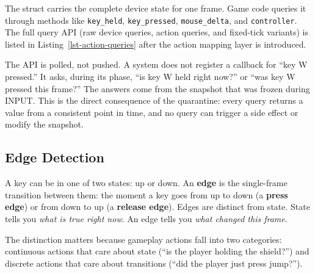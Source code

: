 \documentclass[
  11pt,
  letterpaper,
  DIV=11,
  numbers=noendperiod,
  twoside,
  open=right]{scrreprt}
\newenvironment{Shaded}{}{}
\newcommand{\DataTypeTok}[1]{\textcolor[rgb]{0.84,0.23,0.29}{#1}}
\newcommand{\KeywordTok}[1]{\textcolor[rgb]{0.84,0.23,0.29}{#1}}
\newcommand{\NormalTok}[1]{\textcolor[rgb]{0.14,0.16,0.18}{#1}}
\newcommand{\OperatorTok}[1]{\textcolor[rgb]{0.14,0.16,0.18}{#1}}
\renewenvironment{Shaded}{\begin{snugshade}\small\setstretch{0.95}}{\end{snugshade}}
\begin{document}
\begin{codelisting}

\caption{\label{lst-input-struct}The Input struct: per-frame device
snapshot}

\centering{

\begin{Shaded}
\begin{Highlighting}[]
\KeywordTok{struct}\NormalTok{ Input }\OperatorTok{\{}
\NormalTok{    keyboard}\OperatorTok{:}\NormalTok{    KeyboardState}\OperatorTok{,}
\NormalTok{    mouse}\OperatorTok{:}\NormalTok{       MouseState}\OperatorTok{,}
\NormalTok{    controllers}\OperatorTok{:} \DataTypeTok{Vec}\OperatorTok{\textless{}}\NormalTok{ControllerState}\OperatorTok{\textgreater{},}
\OperatorTok{\}}
\end{Highlighting}
\end{Shaded}

}

\end{codelisting}%

The struct carries the complete device state for one frame. Game code
queries it through methods like \texttt{key\_held},
\texttt{key\_pressed}, \texttt{mouse\_delta}, and \texttt{controller}.
The full query API (raw device queries, action queries, and fixed-tick
variants) is listed in Listing~\ref{lst-action-queries} after the action
mapping layer is introduced.

The API is polled, not pushed. A system does not register a callback for
``key W pressed.'' It asks, during its phase, ``is key W held right
now?'' or ``was key W pressed this frame?'' The answers come from the
snapshot that was frozen during INPUT. This is the direct consequence of
the quarantine: every query returns a value from a consistent point in
time, and no query can trigger a side effect or modify the snapshot.

\subsection{Edge Detection}\label{edge-detection}

A key can be in one of two states: up or down. An \textbf{edge} is the
single-frame transition between them: the moment a key goes from up to
down (a \textbf{press edge}) or from down to up (a \textbf{release
edge}). Edges are distinct from state. State tells you \emph{what is
true right now}. An edge tells you \emph{what changed this frame}.

The distinction matters because gameplay actions fall into two
categories: continuous actions that care about state (``is the player
holding the shield?'') and discrete actions that care about transitions
(``did the player just press jump?'').
\end{document}
